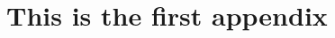 \documentclass[12pt, a4paper, twoside]{book} %
\begin{document}
	\clearpage\mbox{}\clearpage %
	
	\tableofcontents %
	\listoffigures %
	\listoftables %
	\lstlistoflistings %
	
	\cleardoublepage %
	
	\mainmatter
	
	\pagestyle{fancy}
	
	
	
	\appendix
	
	\chapter{This is the first appendix}
	
	\cleardoublepage
	
	\printbibliography[heading=bibintoc] %
	
	\backmatter
	
\end{document}
